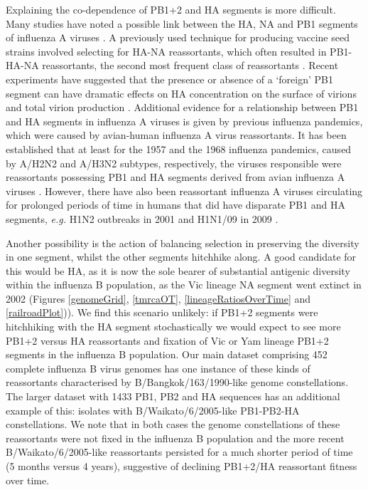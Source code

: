 \documentclass[11pt,oneside,letterpaper]{article}
\begin{document}
Explaining the co-dependence of PB1+2 and HA segments is more difficult.
Many studies have noted a possible link between the HA, NA and PB1 segments of influenza A viruses \cite{bergeron2010,fulvini2011}.
A previously used technique for producing vaccine seed strains involved selecting for HA-NA reassortants, which often resulted in PB1-HA-NA reassortants, the second most frequent class of reassortants \cite{bergeron2010,fulvini2011}.
Recent experiments have suggested that the presence or absence of a `foreign' PB1 segment can have dramatic effects on HA concentration on the surface of virions and total virion production \cite{cobbin2013}.
Additional evidence for a relationship between PB1 and HA segments in influenza A viruses is given by previous influenza pandemics, which were caused by avian-human influenza A virus reassortants.
It has been established that at least for the 1957 and the 1968 influenza pandemics, caused by A/H2N2 and A/H3N2 subtypes, respectively, the viruses responsible were reassortants possessing PB1 and HA segments derived from avian influenza A viruses \cite{kawaoka1989}.
However, there have also been reassortant influenza A viruses circulating for prolonged periods of time in humans that did have disparate PB1 and HA segments, \textit{e.g.} H1N2 outbreaks in 2001 \cite{gregory2002} and H1N1/09 in 2009 \cite{smith2009}.

Another possibility is the action of balancing selection in preserving the diversity in one segment, whilst the other segments hitchhike along.
A good candidate for this would be HA, as it is now the sole bearer of substantial antigenic diversity within the influenza B population, as the Vic lineage NA segment went extinct in 2002 (Figures \ref{genomeGrid}, \ref{tmrcaOT}, \ref{lineageRatiosOverTime} and \ref{railroadPlot})).
We find this scenario unlikely: if PB1+2 segments were hitchhiking with the HA segment stochastically we would expect to see more PB1+2 versus HA reassortants and fixation of Vic or Yam lineage PB1+2 segments in the influenza B population.
Our main dataset comprising 452 complete influenza B virus genomes has one instance of these kinds of reassortants characterised by B/Bangkok/163/1990-like genome constellations.
The larger dataset with 1433 PB1, PB2 and HA sequences has an additional example of this: isolates with B/Waikato/6/2005-like PB1-PB2-HA constellations.
We note that in both cases the genome constellations of these reassortants were not fixed in the influenza B population and the more recent B/Waikato/6/2005-like reassortants persisted for a much shorter period of time (5 months versus 4 years), suggestive of declining PB1+2/HA reassortant fitness over time.
\end{document}
